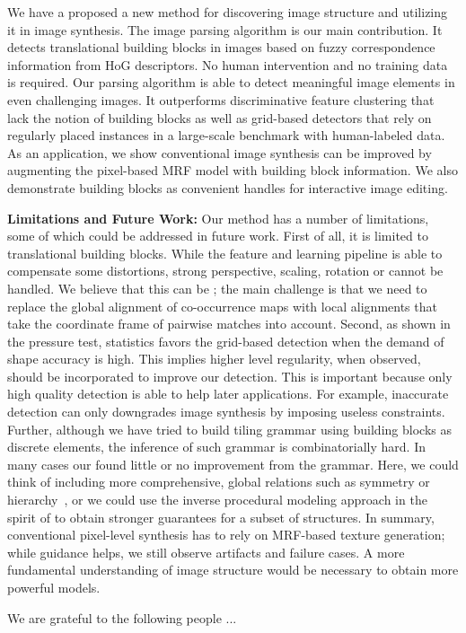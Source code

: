 \documentclass{acmtog}
\begin{document}
We have a proposed a new method for discovering image structure and utilizing it in image synthesis. The image parsing algorithm is our main contribution. It detects translational building blocks in images based on fuzzy correspondence information from HoG descriptors. No human intervention and no training data is required. Our parsing algorithm is able to detect meaningful image elements in even challenging images. It outperforms discriminative feature clustering that lack the notion of building blocks as well as grid-based detectors that rely on regularly placed instances in a large-scale benchmark with human-labeled data. As an application, we show conventional image synthesis can be improved by augmenting the pixel-based MRF model with building block information. We also demonstrate building blocks as convenient handles for interactive image editing. 

\textbf{Limitations and Future Work:} Our method has a number of limitations, some of which could be addressed in future work. First of all, it is limited to translational building blocks. While the feature and learning pipeline is able to compensate some distortions, strong perspective, scaling, rotation or cannot be handled. We believe that this can be ; the main challenge is that we need to replace the global alignment of co-occurrence maps with local alignments that take the coordinate frame of pairwise matches into account. Second, as shown in the pressure test, statistics favors the grid-based detection when the demand of shape accuracy is high. This implies higher level regularity, when observed, should be incorporated to improve our detection.  This is important because only high quality detection is able to help later applications. For example, inaccurate detection can only downgrades image synthesis by imposing useless constraints. Further, although we have tried to build tiling grammar using building blocks as discrete elements, the inference of such grammar is combinatorially hard. In many cases our found little or no improvement from the grammar. Here, we could think of including more comprehensive, global relations such as symmetry or hierarchy~\cite{Hu2013PPI}, or we could use the inverse procedural modeling approach in the spirit of \cite{BOKELOHsig2010,Sylvain2010AT} to obtain stronger guarantees for a subset of structures. In summary, conventional pixel-level synthesis has to rely on MRF-based texture generation; while guidance helps, we still observe artifacts and failure cases. A more fundamental understanding of image structure would be necessary to obtain more powerful models.

\begin{acks}
We are grateful to the following people ... 
\end{acks}





\end{document}
